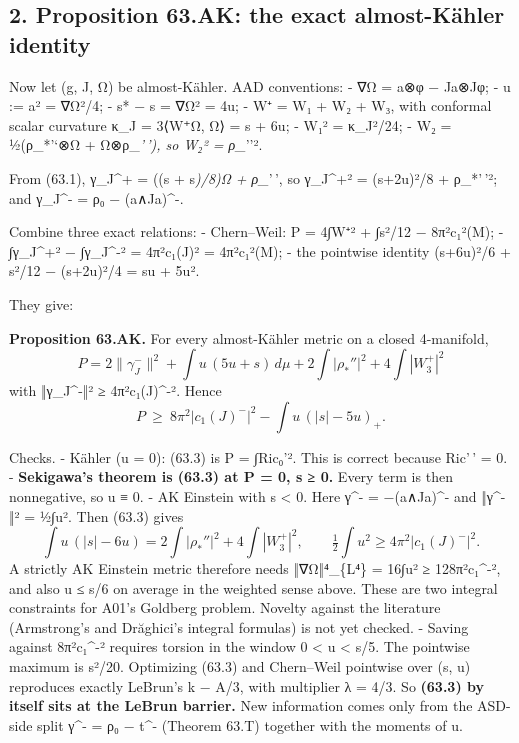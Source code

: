 \documentclass[
  10pt,
]{report}
\begin{document}
\hypertarget{proposition-63.ak-the-exact-almost-kuxe4hler-identity}{%
\subsection{2. Proposition 63.AK: the exact almost-Kähler
identity}\label{proposition-63.ak-the-exact-almost-kuxe4hler-identity}}

Now let (g, J, Ω) be almost-Kähler. AAD conventions: - ∇Ω = a⊗φ − Ja⊗Jφ;
- u := \textbar a\textbar² = \textbar∇Ω\textbar²/4; - s* − s =
\textbar∇Ω\textbar² = 4u; - W⁺ = W₁ + W₂ + W₃, with conformal scalar
curvature κ\_J = 3⟨W⁺Ω, Ω⟩ = s + 6u; - \textbar W₁\textbar² = κ\_J²/24;
- W₂ = ½(ρ\_*'`⊗Ω + Ω⊗ρ\_\emph{'\,'), so \textbar W₂\textbar² =
\textbar ρ\_}''\textbar².

From (63.1), γ\_J\^{}+ = ((s + s\emph{)/8)Ω + ρ\_}'\,', so
\textbar γ\_J\^{}+\textbar² = (s+2u)²/8 + \textbar ρ\_*'\,'\textbar²;
and γ\_J\^{}- = ρ₀ − (a∧Ja)\^{}-.

Combine three exact relations: - Chern--Weil: P = 4∫\textbar W⁺\textbar²
+ ∫s²/12 − 8π²c₁²(M); - ∫\textbar γ\_J\^{}+\textbar² −
∫\textbar γ\_J\^{}-\textbar² = 4π²c₁(J)² = 4π²c₁²(M); - the pointwise
identity (s+6u)²/6 + s²/12 − (s+2u)²/4 = su + 5u².

They give:

\textbf{Proposition 63.AK.} For every almost-Kähler metric on a closed
4-manifold, \[
\boxed{\ P=2\|\gamma_J^-\|^2+\int u\,(5u+s)\,d\mu+2\int|\rho_*''|^2+4\int|W_3^+|^2\ }
\tag{63.3}
\] with ‖γ\_J\^{}-‖² ≥ 4π²\textbar c₁(J)\^{}-\textbar². Hence \[
P\ \ge\ 8\pi^2|c_1(J)^-|^2-\int u\,(|s|-5u)_+ .
\]

Checks. - Kähler (u = 0): (63.3) is P = ∫\textbar Ric₀'\textbar². This
is correct because Ric'\,' = 0. - \textbf{Sekigawa's theorem is (63.3)
at P = 0, s ≥ 0.} Every term is then nonnegative, so u ≡ 0. - AK
Einstein with s \textless{} 0. Here γ\^{}- = −(a∧Ja)\^{}- and ‖γ\^{}-‖²
= ½∫u². Then (63.3) gives \[
  \int u\,(|s|-6u)=2\int|\rho_*''|^2+4\int|W_3^+|^2,\qquad
  \tfrac12\int u^2\ge4\pi^2|c_1(J)^-|^2 .
  \] A strictly AK Einstein metric therefore needs ‖∇Ω‖⁴\_\{L⁴\} = 16∫u²
≥ 128π²\textbar c₁\^{}-\textbar², and also u ≤ \textbar s\textbar/6 on
average in the weighted sense above. These are two integral constraints
for A01's Goldberg problem. Novelty against the literature (Armstrong's
and Drăghici's integral formulas) is not yet checked. - Saving against
8π²\textbar c₁\^{}-\textbar² requires torsion in the window 0
\textless{} u \textless{} \textbar s\textbar/5. The pointwise maximum is
s²/20. Optimizing (63.3) and Chern--Weil pointwise over (s, u)
reproduces exactly LeBrun's k − A/3, with multiplier λ = 4/3. So
\textbf{(63.3) by itself sits at the LeBrun barrier.} New information
comes only from the ASD-side split γ\^{}- = ρ₀ − t\^{}- (Theorem 63.T)
together with the moments of u.
\end{document}
